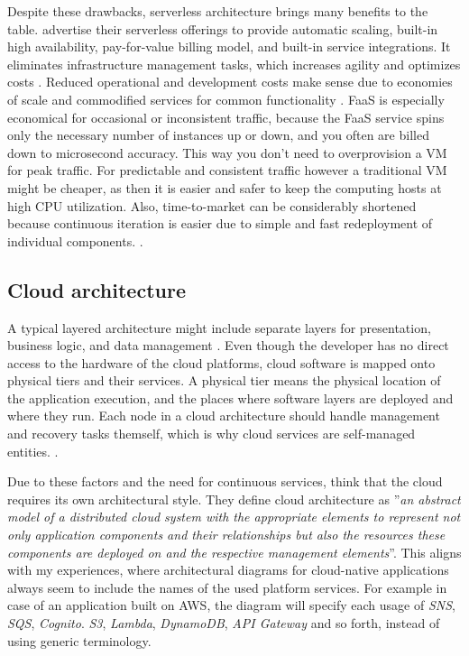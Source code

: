 \documentclass[utf8,english]{gradu3}
\begin{document}
Despite these drawbacks, serverless architecture brings many benefits to the
table. \textcite{AWS-serverless} advertise their serverless offerings to provide
automatic scaling, built-in high availability, pay-for-value billing model, and
built-in service integrations. It eliminates infrastructure management tasks,
which increases agility and optimizes costs \parencite{AWS-serverless}. Reduced
operational and development costs make sense due to economies of scale and
commodified services for common functionality \parencite{Roberts2018}. FaaS is
especially economical for occasional or inconsistent traffic, because the FaaS
service spins only the necessary number of instances up or down, and you often
are billed down to microsecond accuracy. This way you don't need to overprovision a
VM for peak traffic. For predictable and consistent traffic however a
traditional VM might be cheaper, as then it is easier and safer to keep the computing hosts at
high CPU utilization. Also, time-to-market can be considerably shortened because
continuous iteration is easier due to simple and fast redeployment of individual
components. \parencite{Roberts2018}.


\subsection{Cloud architecture}

A typical layered architecture might include separate layers for presentation,
business logic, and data management \parencite[5]{Pahl2018}. Even though the
developer has no direct access to the hardware of the cloud platforms, cloud
software is mapped onto physical tiers and their services. A physical tier means
the physical location of the application execution, and the places where
software layers are deployed and where they run. Each node in a cloud
architecture should handle management and recovery tasks themself, which is why
cloud services are self-managed entities. \parencite[5]{Pahl2018}.

Due to these factors and the need for continuous services,
\textcite[5]{Pahl2018} think that the cloud requires its own architectural
style. They define cloud architecture as ''\textit{an abstract model of a distributed
  cloud system with the appropriate elements to represent not only application
  components and their relationships but also the resources these components are
  deployed on and the respective management elements}''. This aligns with my
experiences, where architectural diagrams for cloud-native applications always
seem to include the names of the used platform services. For example in case of an
application built on AWS, the diagram will specify each usage of \textit{SNS},
\textit{SQS}, \textit{Cognito}. \textit{S3}, \textit{Lambda}, \textit{DynamoDB},
\textit{API Gateway} and so forth, instead of using generic terminology.
\end{document}
